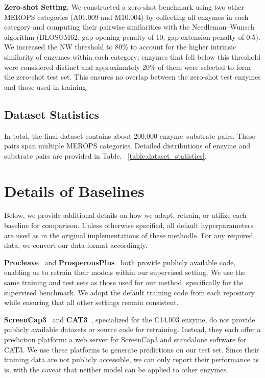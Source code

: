 \textbf{Zero-shot Setting.} 
We constructed a zero-shot benchmark using two other MEROPS categories (A01.009 and M10.004) by collecting all enzymes in each category and computing their pairwise similarities with the Needleman--Wunsch algorithm (BLOSUM62, gap opening penalty of 10, gap extension penalty of 0.5). We increased the NW threshold to 80\% to account for the higher intrinsic similarity of enzymes within each category; enzymes that fell below this threshold were considered distinct and approximately 20\% of them were selected to form the zero-shot test set. This ensures no overlap between the zero-shot test enzymes and those used in training.

\subsection{Dataset Statistics}
In total, the final dataset contains about 200,000 enzyme--substrate pairs. These pairs span multiple MEROPS categories. Detailed distributions of enzyme and substrate pairs are provided in Table. ~\ref{table:dataset_statistics}.





\section{Details of Baselines}
\label{sec:app_baseline}

Below, we provide additional details on how we adapt, retrain, or utilize each baseline for comparison. Unless otherwise specified, all default hyperparameters are used as in the original implementations of these methodle. For any required data, we convert our data format accordingly.

\textbf{Procleave}~\cite{procleave} and \textbf{ProsperousPlus}~\cite{ProsperousPlus} both provide publicly available code, enabling us to retrain their models within our supervised setting. We use the same training and test sets as those used for our method, specifically for the supervised benchmark. We adopt the default training code from each repository while ensuring that all other settings remain consistent.



\textbf{ScreenCap3}~\cite{ScreenCap3} and \textbf{CAT3}~\cite{CAT3}, specialized for the C14.003 enzyme, do not provide publicly available datasets or source code for retraining. Instead, they each offer a prediction platform: a web server for ScreenCap3 and standalone software for CAT3. We use these platforms to generate predictions on our test set. Since their training data are not publicly accessible, we can only report their performance as is, with the caveat that neither model can be applied to other enzymes.



